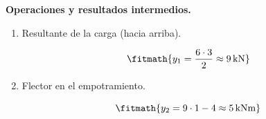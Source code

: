 \noindent\textbf{Operaciones y resultados intermedios.}

\begin{enumerate}

\item Resultante de la carga (hacia arriba).

\[\fitmath{y_{1}=\frac{6\cdot 3}{2}\approx 9\,\mathrm{kN}}\]

\item Flector en el empotramiento.

\[\fitmath{y_{2}=9\cdot 1-4\approx 5\,\mathrm{kN m}}\]

\end{enumerate}
